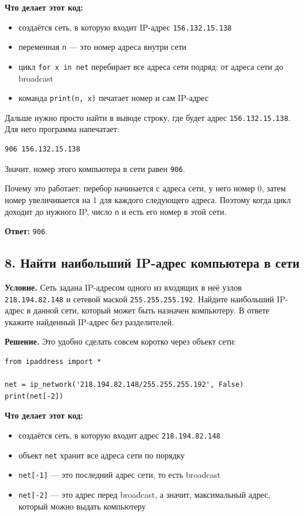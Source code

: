 \documentclass[11pt]{article}
\begin{document}
\textbf{Что делает этот код:}
\begin{itemize}
  \item создаётся сеть, в которую входит IP-адрес \texttt{156.132.15.138}
  \item переменная \texttt{n} --- это номер адреса внутри сети
  \item цикл \texttt{for x in net} перебирает все адреса сети подряд: от адреса сети до broadcast
  \item команда \texttt{print(n, x)} печатает номер и сам IP-адрес
\end{itemize}

Дальше нужно просто найти в выводе строку, где будет адрес \texttt{156.132.15.138}. Для него программа напечатает:
\begin{verbatim}
906 156.132.15.138
\end{verbatim}

Значит, номер этого компьютера в сети равен \texttt{906}.

Почему это работает: перебор начинается с адреса сети, у него номер 0, затем номер увеличивается на 1 для каждого следующего адреса. Поэтому когда цикл доходит до нужного IP, число \texttt{n} и есть его номер в этой сети.

\textbf{Ответ:} \texttt{906}.

\subsection*{8. Найти наибольший IP-адрес компьютера в сети}

\textbf{Условие.} Сеть задана IP-адресом одного из входящих в неё узлов \texttt{218.194.82.148} и сетевой маской \texttt{255.255.255.192}. Найдите наибольший IP-адрес в данной сети, который может быть назначен компьютеру. В ответе укажите найденный IP-адрес без разделителей.

\textbf{Решение.} Это удобно сделать совсем коротко через объект сети:
\begin{verbatim}
from ipaddress import *

net = ip_network('218.194.82.148/255.255.255.192', False)
print(net[-2])
\end{verbatim}

\textbf{Что делает этот код:}
\begin{itemize}
  \item создаётся сеть, в которую входит адрес \texttt{218.194.82.148}
  \item объект \texttt{net} хранит все адреса сети по порядку
  \item \texttt{net[-1]} --- это последний адрес сети, то есть broadcast
  \item \texttt{net[-2]} --- это адрес перед broadcast, а значит, максимальный адрес, который можно выдать компьютеру
\end{itemize}
\end{document}
